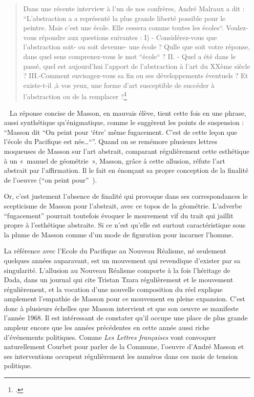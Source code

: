 \begin{quote}
Dans une récente interview à l’un de nos confrères, André Malraux a dit : “L’abstraction a a représenté la plus grande liberté possible pour le peintre. Mais c’est une école. Elle cessera comme toutes les écoles“. Voulez-vous répondre aux questions suivantes :  I) - Considérez-vous que l’abstraction soit- ou soit devenue- une école ? Qulle que soit votre réponse, dans quel sens comprenez-vous le mot “école“ ?  II. - Quel a  été dans le passé, quel est aujourd’hui l’apport de l’abstraction à l’art du XXème siècle ? III.-Comment envisagez-vous sa fin ou ses développements éventuels ? Et existe-t-il ,à vos yeux, une forme d’art susceptible de succéder à l’abstraction ou de la remplacer ?\footcite{avantgarde}
\end{quote}
 
	 La réponse concise de Masson, en mauvais élève, tient cette fois en une phrase, aussi synthétique qu’énigmatique, comme le suggèrent les points de suspension : \enquote{Masson dit “On peint pour \enquote{être} même fugacement. C’est de cette leçon que l’école du Pacifique est née…“}. Quand on se remémore plusieurs lettres moqueuses de Masson sur l’art abstrait, comparant régulièrement cette esthétique à un « manuel de géométrie », Masson, grâce à cette allusion, réfute l’art abstrait par l’affirmation. Il le fait en énonçant sa propre conception de la finalité de l’oeuvre (\enquote{on peint pour} ). 

	Or, c’est justement l’absence de finalité qui provoque dans ses correspondances le scepticisme de Masson pour l’abstrait, avec ce topos  de la géométrie. L’adverbe \enquote{fugacement} pourrait toutefois évoquer le mouvement vif du trait qui jaillit propre à l’esthétique abstraite. Si ce n’est qu’elle est surtout caractéristique sous la plume de Masson comme d’un mode de figuration pour incarner l’homme. 

	La référence avec l’Ecole du Pacifique au Nouveau Réalisme, né seulement quelques années auparavant, est un mouvement qui revendique d’exister par sa singularité. L’allusion au Nouveau Réalisme comporte à la fois l’héritage de Dada, dans un journal qui cite Tristan Tzara régulièrement et le mouvement régulièrement, et la vocation d’une nouvelle composition du réel explique amplement l’empathie de Masson pour ce mouvement en pleine expansion. C’est donc à plusieurs échelles que Masson intervient et que son oeuvre se manifeste l’année 1968. Il est intéressant de constater qu’il occupe une place de plus grande ampleur encore que les années précédentes en cette année aussi riche d’événements politiques. Comme \emph{Les Lettres françaises} vont convoquer naturellement Courbet pour parler de la Commune, l’oeuvre d’André Masson et ses interventions occupent régulièrement les numéros dans ces mois de tension politique. 

